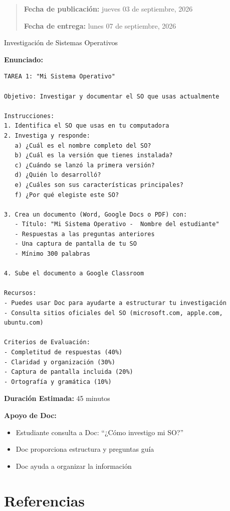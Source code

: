 \documentclass[
  spanish,
  12pt,
  letterpaper,
  DIV=11,
  numbers=noendperiod]{scrreprt}
\providecommand{\tightlist}{%
  \setlength{\itemsep}{0pt}\setlength{\parskip}{0pt}}
\begin{document}
\begin{quote}
\textbf{Fecha de publicación:} jueves 03 de septiembre, 2026

\textbf{Fecha de entrega:} lunes 07 de septiembre, 2026
\end{quote}

Investigación de Sistemas Operativos

\textbf{Enunciado:}

\begin{verbatim}
TAREA 1: "Mi Sistema Operativo"

Objetivo: Investigar y documentar el SO que usas actualmente

Instrucciones:
1. Identifica el SO que usas en tu computadora
2. Investiga y responde:
   a) ¿Cuál es el nombre completo del SO?
   b) ¿Cuál es la versión que tienes instalada?
   c) ¿Cuándo se lanzó la primera versión?
   d) ¿Quién lo desarrolló?
   e) ¿Cuáles son sus características principales?
   f) ¿Por qué elegiste este SO?

3. Crea un documento (Word, Google Docs o PDF) con:
   - Título: "Mi Sistema Operativo -  Nombre del estudiante"
   - Respuestas a las preguntas anteriores
   - Una captura de pantalla de tu SO
   - Mínimo 300 palabras

4. Sube el documento a Google Classroom

Recursos:
- Puedes usar Doc para ayudarte a estructurar tu investigación
- Consulta sitios oficiales del SO (microsoft.com, apple.com, ubuntu.com)

Criterios de Evaluación:
- Completitud de respuestas (40%)
- Claridad y organización (30%)
- Captura de pantalla incluida (20%)
- Ortografía y gramática (10%)
\end{verbatim}

\textbf{Duración Estimada:} 45 minutos

\textbf{Apoyo de Doc:}

\begin{itemize}
\tightlist
\item
  Estudiante consulta a Doc: ``¿Cómo investigo mi SO?''
\item
  Doc proporciona estructura y preguntas guía
\item
  Doc ayuda a organizar la información
\end{itemize}

\section{Referencias}\label{referencias-2}
\end{document}
